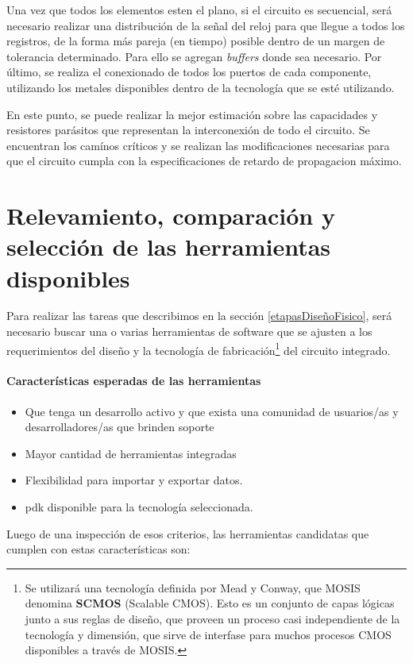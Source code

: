 Una vez que todos los elementos esten el plano, si el circuito es secuencial, será necesario realizar una distribución de la señal del reloj para que llegue a todos los registros, de la forma más pareja (en tiempo) posible dentro de un margen de tolerancia determinado. Para ello se agregan \emph{buffers} donde sea necesario. Por último, se realiza el conexionado de todos los puertos de cada componente, utilizando los metales disponibles dentro de la tecnología que se esté utilizando.

En este punto, se puede realizar la mejor estimación sobre las capacidades y resistores parásitos que representan la interconexión de todo el circuito. Se encuentran los camínos críticos y se realizan las modificaciones necesarias para que el circuito cumpla con la especificaciones de retardo de propagacion máximo.

\section{Relevamiento, comparación y selección de las herramientas disponibles}
Para realizar las tareas que describimos en la sección \ref{etapasDiseñoFisico}, será necesario buscar una o varias herramientas de software que se ajusten a los requerimientos del diseño y la tecnología de fabricación\footnote{Se utilizará una tecnología definida por Mead y Conway\cite{mead-conway80}, que MOSIS denomina \textbf{SCMOS} (Scalable CMOS).
Esto es un conjunto de capas lógicas junto a sus reglas de diseño, que proveen un proceso casi independiente de la tecnología y dimensión, que sirve de interfase para muchos procesos CMOS disponibles a través de MOSIS.} del circuito integrado.

\paragraph{Características esperadas de las herramientas}
\begin{itemize}
\item Que tenga un desarrollo activo y que exista una comunidad de usuarios/as y desarrolladores/as que brinden soporte
\item Mayor cantidad de herramientas integradas
\item Flexibilidad para importar y exportar datos. 
\item \gls{pdk} disponible para la tecnología seleccionada.
\end{itemize}

Luego de una inspección de esos criterios, las herramientas candidatas que cumplen con estas características son:

